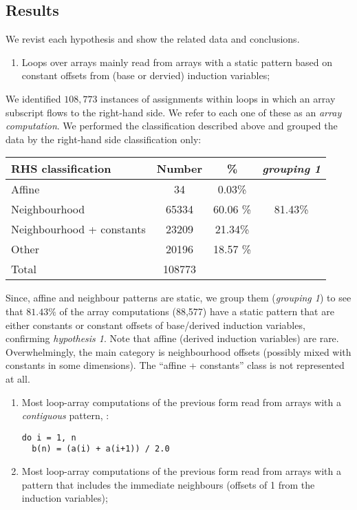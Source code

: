 \subsection{Results}

\noindent
We revist each hypothesis and show the related data and conclusions.
%
\begin{enumerate}
\item Loops over arrays mainly read from arrays with a static pattern
based on constant offsets from (base or dervied) induction variables;
\end{enumerate}
%
We identified $108,773$ instances of assignments within loops in
which an array subscript flows to the right-hand side. We refer
to each one of these as an \emph{array computation}.
We performed the classification described above
and grouped the data by the right-hand side classification only:
\begin{center}
\begin{tabular}{lS[table-format=4]@{\extracolsep{5pt}}S[table-format=2.2]c}
\textbf{RHS classification} & \textbf{Number} & \% &
\textit{grouping 1} \\ \hline
Affine                          & 34        & 0.03\%
&  \\ 
Neighbourhood                   & 65334     & 60.06 \%  \\ 
Neighbourhood + constants       & 23209     & 21.34\%  \\ \hline
Other                           & 20196     & 18.57 \%  \\ \hline \hline
Total                           & 108773    &  \\
\end{tabular}
\end{center}
%
\noindent
Since, affine and neighbour patterns are static, we
group them (\textit{grouping 1}) to see that $81.43\%$ of the array
computations (88,577) have a static pattern that are either constants or
constant offsets of base/derived induction variables, confirming
\emph{hypothesis 1}. Note that affine (derived induction variables)
are rare. Overwhelmingly, the main category is neighbourhood
offsets (possibly mixed with constants in some
dimensions). The ``affine + constants'' class is
not represented at all.
%
\begin{enumerate}[resume]
\item Most loop-array computations of the previous form read
from arrays with a \emph{contiguous} pattern, \eg{}:
%
\begin{verbatim}
do i = 1, n
  b(n) = (a(i) + a(i+1)) / 2.0
\end{verbatim}
%
\item Most loop-array computations of the previous form read
from arrays with a pattern that includes the immediate
neighbours (offsets of 1 from the induction variables);
\end{enumerate}
